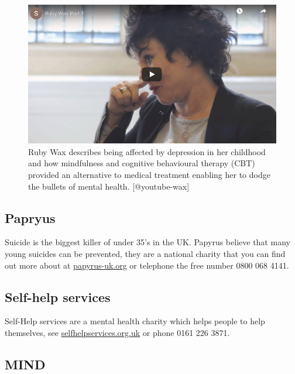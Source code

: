 \documentclass[
]{book}
\begin{document}
\begin{figure}

{\centering \includegraphics[width=0.99\linewidth]{images/youtube-wax} 

}

\caption{Ruby Wax describes being affected by depression in her childhood and how mindfulness and cognitive behavioural therapy (CBT) provided an alternative to medical treatment enabling her to dodge the bullets of mental health. [@youtube-wax]}\label{fig:rubywax-fig}
\end{figure}

\hypertarget{papryus}{%
\subsection{Papryus}\label{papryus}}

Suicide is the biggest killer of under 35's in the UK. Papyrus believe that many young suicides can be prevented, they are a national charity that you can find out more about at \href{https://www.papyrus-uk.org/}{papyrus-uk.org} or telephone the free number 0800 068 4141.

\hypertarget{selfhelp}{%
\subsection{Self-help services}\label{selfhelp}}

Self-Help services are a mental health charity which helps people to help themselves, see \href{https://www.selfhelpservices.org.uk/}{selfhelpservices.org.uk} or phone 0161 226 3871.

\hypertarget{mindhelp}{%
\subsection{MIND}\label{mindhelp}}
\end{document}

